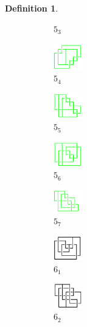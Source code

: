 \documentclass{article}
\theoremstyle{definition}
\newtheorem{defn}[thm]{Definition}
\theoremstyle{theorem}
\theoremstyle{proposition}
\theoremstyle{corollary}
\begin{document}
\begin{defn}
\begin{figure}[H]
\begin{subfigure}{0.075\textwidth}
    \caption{$5_3$}
    \end{subfigure}
    \begin{subfigure}{0.075\textwidth}
    \includegraphics[width=1.25cm]{../Midterm_Poster/grid_diagram/theta_5_4.png}
    \caption{$5_4$} 
    \end{subfigure}
    \begin{subfigure}{0.075\textwidth}
    \includegraphics[width=1.25cm]{../Midterm_Poster/grid_diagram/theta_5_5.png}
    \caption{$5_5$} 
    \end{subfigure}
    \begin{subfigure}{0.075\textwidth}
    \includegraphics[width=1.25cm]{../Midterm_Poster/grid_diagram/theta_5_6.png}
    \caption{$5_6$} 
    \end{subfigure}
    \begin{subfigure}{0.075\textwidth}
    \includegraphics[width=1.25cm]{../Midterm_Poster/grid_diagram/theta_5_7.png}
    \caption{$5_7$} 
    \end{subfigure}
    \begin{subfigure}{0.075\textwidth}
    \includegraphics[width=1.25cm]{../Midterm_Poster/grid_diagram/theta_6_1.png}
    \caption{$6_1$} 
    \end{subfigure}
    \begin{subfigure}{0.075\textwidth}
    \includegraphics[width=1.25cm]{../Midterm_Poster/grid_diagram/theta_6_2.png}
    \caption{$6_2$} 
    \end{subfigure}
    \begin{subfigure}{0.075\textwidth}

\end{subfigure}
\end{figure}
\end{defn}
\end{document}
